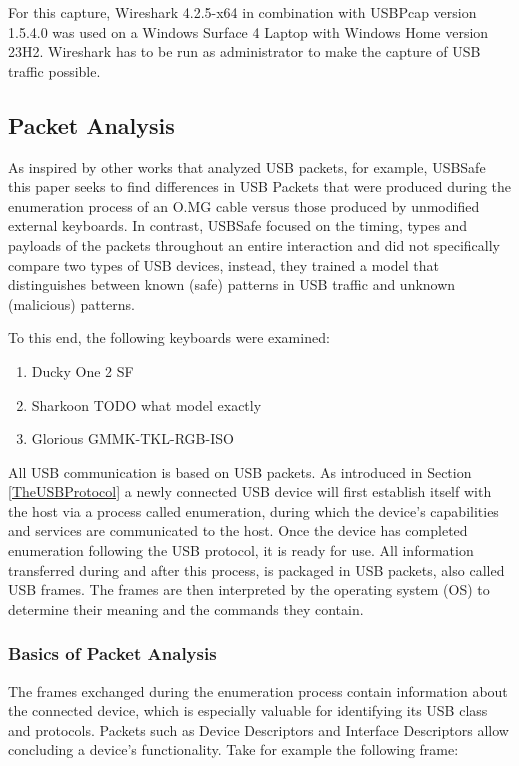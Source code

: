 For this capture, Wireshark 4.2.5-x64 in combination with USBPcap version 1.5.4.0 was used on a Windows Surface 4 Laptop with Windows Home version 23H2. Wireshark has to be run as administrator to make the capture of USB traffic possible.


\subsection{Packet Analysis}\label{Packet Analysis}


As inspired by other works that analyzed USB packets, for example, USBSafe \cite{kharrazUSBESAFEEndPointSolution2019} this paper seeks to find differences in USB Packets that were produced during the enumeration process of an O.MG cable versus those produced by unmodified external keyboards. In contrast, USBSafe focused on the timing, types and payloads of the packets throughout an entire interaction and did not specifically compare two types of USB devices, instead, they trained a model that distinguishes between known (safe) patterns in USB traffic and unknown (malicious) patterns. 

To this end, the following keyboards were examined:
\begin{enumerate}
    \item Ducky One 2 SF
    \item Sharkoon TODO what model exactly
    \item Glorious GMMK-TKL-RGB-ISO
\end{enumerate}


All USB communication is based on USB packets. As introduced in Section \ref{TheUSBProtocol} a newly connected USB device will first establish itself with the host via a process called enumeration, during which the device's capabilities and services are communicated to the host. Once the device has completed enumeration following the USB protocol, it is ready for use.
All information transferred during and after this process, is packaged in USB packets, also called USB frames. The frames are then interpreted by the operating system (OS) to determine their meaning and the commands they contain.



\subsubsection{Basics of Packet Analysis}

The frames exchanged during the enumeration process contain information about the connected device, which is especially valuable for identifying its USB class and protocols.
Packets such as Device Descriptors and Interface Descriptors allow concluding a device's functionality. Take for example the following frame:

